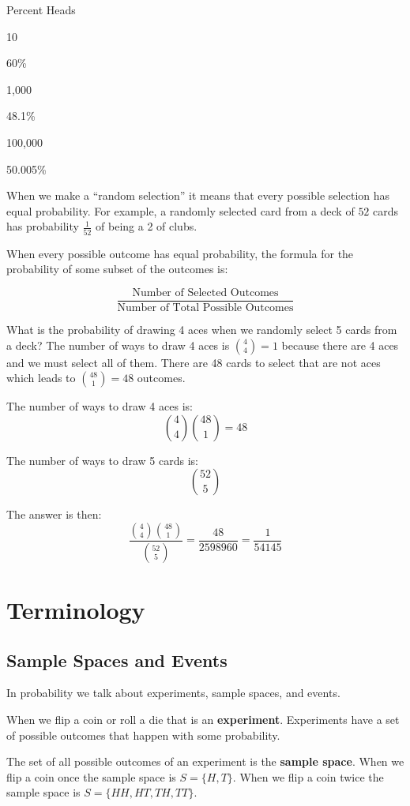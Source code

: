 \documentclass[
]{book}
\theoremstyle{definition}
\theoremstyle{definition}
\theoremstyle{definition}
\theoremstyle{remark}
\begin{document}
Percent Heads

10

60\%

1,000

48.1\%

100,000

50.005\%

When we make a ``random selection'' it means that every possible selection has equal probability. For example, a randomly selected card from a deck of \(52\) cards has probability \(\frac{1}{52}\) of being a 2 of clubs.

When every possible outcome has equal probability, the formula for the probability of some subset of the outcomes is:

\[\frac{\text{Number of Selected Outcomes}}{\text{Number of Total Possible Outcomes}}\]

What is the probability of drawing 4 aces when we randomly select 5 cards from a deck? The number of ways to draw 4 aces is \({4 \choose 4} = 1\) because there are 4 aces and we must select all of them. There are 48 cards to select that are not aces which leads to \({48 \choose 1} = 48\) outcomes.

The number of ways to draw 4 aces is:
\[{4 \choose 4}{48 \choose 1} = 48\]

The number of ways to draw 5 cards is:
\[{52 \choose 5}\]

The answer is then:
\[\frac{{4 \choose 4}{48 \choose 1}}{{52 \choose 5}} = \frac{48}{2598960} = \frac{1}{54145}\]

\hypertarget{terminology}{%
\section{Terminology}\label{terminology}}

\hypertarget{sample-spaces-and-events}{%
\subsection{Sample Spaces and Events}\label{sample-spaces-and-events}}

In probability we talk about experiments, sample spaces, and events.

When we flip a coin or roll a die that is an \textbf{experiment}. Experiments have a set of possible outcomes that happen with some probability.

The set of all possible outcomes of an experiment is the \textbf{sample space}. When we flip a coin once the sample space is \(S=\{H,T\}\). When we flip a coin twice the sample space is \(S=\{HH,HT,TH,TT\}\).
\end{document}
